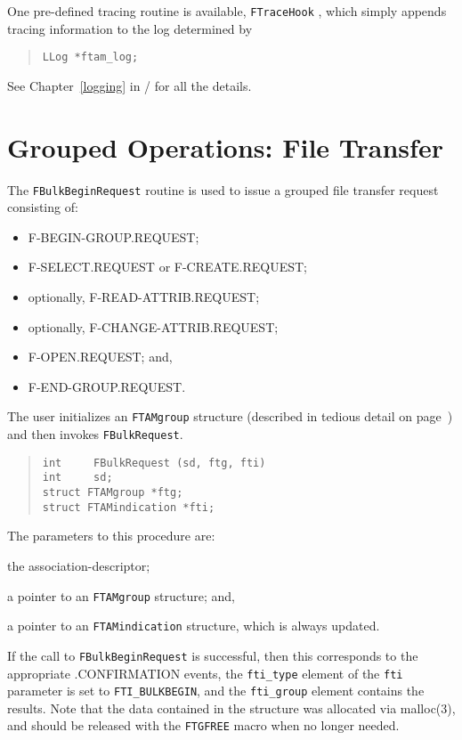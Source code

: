 One pre-defined tracing routine is available, \verb"FTraceHook"
,
which simply appends tracing information to the log determined by
\begin{quote}\small\begin{verbatim}
LLog *ftam_log;
\end{verbatim}\end{quote}
See Chapter~\ref{logging} in \voltwo/ for all the details.

\section	{Grouped Operations: File Transfer}
The \verb"FBulkBeginRequest" routine is used to issue a grouped file transfer
request consisting of:
\begin{itemize}
\item	{\sf F-BEGIN-GROUP.REQUEST\/};

\item	{\sf F-SELECT.REQUEST\/} or {\sf F-CREATE.REQUEST\/};

\item	optionally, {\sf F-READ-ATTRIB.REQUEST\/};

\item	optionally, {\sf F-CHANGE-ATTRIB.REQUEST\/};

\item	{\sf F-OPEN.REQUEST\/};
and,

\item	{\sf F-END-GROUP.REQUEST}.
\end{itemize}
The user initializes an \verb"FTAMgroup" structure
(described in tedious detail on page~\pageref{FTAMgroup})
and then invokes \verb"FBulkRequest".
\begin{quote}\small\begin{verbatim}
int     FBulkRequest (sd, ftg, fti)
int     sd;
struct FTAMgroup *ftg;
struct FTAMindication *fti;
\end{verbatim}\end{quote}
The parameters to this procedure are:
\begin{describe}
\item[\verb"sd":] the association-descriptor;

\item[\verb"ftg":] a pointer to an \verb"FTAMgroup" structure;
and,

\item[\verb"fti":] a pointer to an \verb"FTAMindication" structure, which is
always updated.
\end{describe}
If the call to \verb"FBulkBeginRequest" is successful,
then this corresponds to the appropriate {\sf .CONFIRMATION\/} events,
the \verb"fti_type" element of the \verb"fti" parameter is set to
\verb"FTI_BULKBEGIN",
and the \verb"fti_group" element contains the results.
Note that the data contained in the structure was allocated via \man malloc(3),
and should be released with the \verb"FTGFREE" macro when no longer needed.

